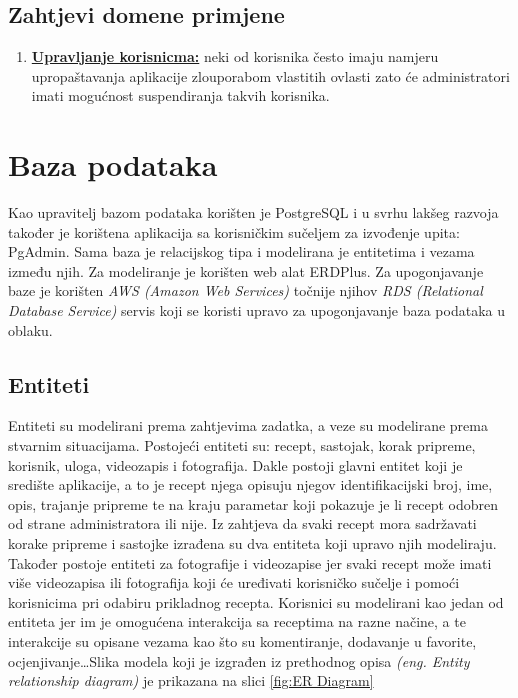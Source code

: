 \documentclass[times, utf8, zavrsni]{fer}
\begin{document}
\section{Zahtjevi domene primjene}
\begin{enumerate}
      \item \textbf{\underline{Upravljanje korisnicma:}} neki od korisnika često imaju namjeru
            upropaštavanja aplikacije zlouporabom vlastitih ovlasti zato će administratori imati
            mogućnost suspendiranja takvih korisnika.

\end{enumerate}
\chapter{Baza podataka}
Kao upravitelj bazom podataka korišten je PostgreSQL i u svrhu lakšeg razvoja također
je korištena aplikacija sa korisničkim sučeljem za izvođenje upita: PgAdmin.
Sama baza je relacijskog tipa i modelirana je entitetima i vezama između njih.
Za modeliranje je korišten web alat ERDPlus. Za upogonjavanje baze je korišten \textit{AWS (Amazon Web Services)}
točnije njihov \textit{RDS (Relational Database Service)} servis koji se koristi upravo za upogonjavanje baza podataka u oblaku.

\section{Entiteti}
Entiteti su modelirani prema zahtjevima zadatka, a veze su modelirane prema stvarnim situacijama.
Postojeći entiteti su: recept, sastojak, korak pripreme, korisnik, uloga, videozapis i
fotografija. Dakle postoji glavni entitet koji je središte aplikacije, a to je recept
njega opisuju njegov identifikacijski broj, ime, opis, trajanje pripreme
te na kraju parametar koji pokazuje je li recept odobren od strane administratora ili nije.
Iz zahtjeva da svaki recept mora sadržavati korake pripreme i sastojke izrađena su dva entiteta
koji upravo njih modeliraju.
Također postoje entiteti za fotografije i videozapise jer svaki recept može imati
više videozapisa ili fotografija koji će uređivati korisničko sučelje
i pomoći korisnicima pri odabiru prikladnog recepta.
Korisnici su modelirani kao jedan od entiteta jer im je omogućena interakcija sa receptima
na razne načine, a te interakcije su opisane vezama kao što su komentiranje,
dodavanje u favorite, ocjenjivanje\dots Slika modela koji je izgrađen iz prethodnog opisa
\textit{(eng. Entity relationship diagram)} je prikazana na slici \ref{fig:ER Diagram}
\end{document}
